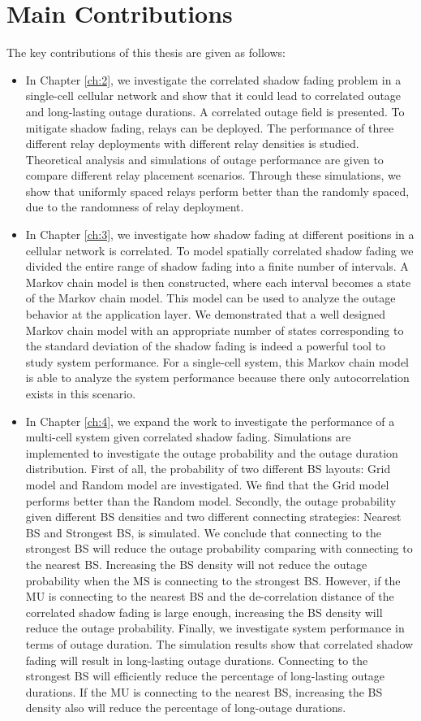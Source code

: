  \section{Main Contributions}
 \par The key contributions of this thesis are given as follows:
 \begin{itemize}
 \item In Chapter \ref{ch:2}, we investigate the correlated shadow fading problem in a single-cell cellular network and show that it could lead to correlated outage and long-lasting outage durations. A correlated outage field is presented. To mitigate shadow fading, relays can be deployed. The performance of three different relay deployments with different relay densities is studied. Theoretical analysis and simulations of outage performance are given to compare different relay placement scenarios. Through these simulations, we show that uniformly spaced relays perform better than the randomly spaced, due to the randomness of relay deployment. 
 \item In Chapter \ref{ch:3}, we investigate how shadow fading at different positions in a cellular network is correlated. To model spatially correlated shadow fading we divided the entire range of shadow fading into a finite number of intervals. A Markov chain model is then constructed, where each interval becomes a state of the Markov chain model. This model can be used to analyze the outage behavior at the application layer. We demonstrated that a well designed Markov chain model with an appropriate number of states corresponding to the standard deviation of the shadow fading is indeed a powerful tool to study system performance. For a single-cell system, this Markov chain model is able to analyze the system performance because there only autocorrelation exists in this scenario. 
 \item In Chapter \ref{ch:4}, we expand the work to investigate the performance of a multi-cell system given correlated shadow fading. Simulations are implemented to investigate the outage probability and the outage duration distribution. First of all, the probability of two different BS layouts: Grid model and Random model are investigated. We find that the Grid model performs better than the Random model. Secondly, the outage probability given different BS densities and two different connecting strategies: Nearest BS and Strongest BS, is simulated. We conclude that connecting to the strongest BS will reduce the outage probability comparing with connecting to the nearest BS. Increasing the BS density will not reduce the outage probability when the MS is connecting to the strongest BS. However, if the MU is connecting to the nearest BS and the de-correlation distance of the correlated shadow fading is large enough, increasing the BS density will reduce the outage probability. Finally, we investigate system performance in terms of outage duration. The simulation results show that correlated shadow fading will result in long-lasting outage durations. Connecting to the strongest BS will efficiently reduce the percentage of long-lasting outage durations. If the MU is connecting to the nearest BS, increasing the BS density also will reduce the percentage of long-outage durations.

\end{itemize}
